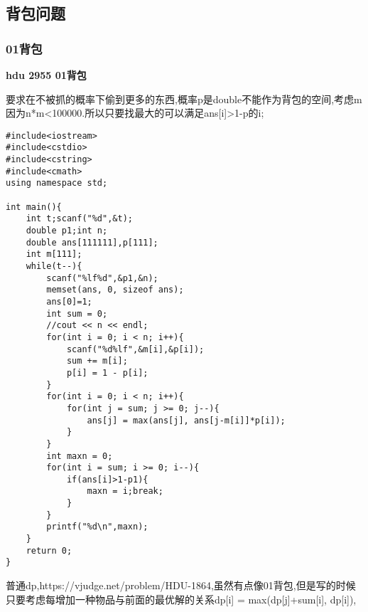 \subsection{背包问题}

\subsubsection{01背包}

{\bfseries hdu 2955 01背包}

要求在不被抓的概率下偷到更多的东西,概率p是double不能作为背包的空间,考虑m因为n*m<100000.所以只要找最大的可以满足ans[i]>1-p的i;

\begin{lstlisting}
#include<iostream>
#include<cstdio>
#include<cstring>
#include<cmath>
using namespace std;

int main(){
    int t;scanf("%d",&t);
    double p1;int n;
    double ans[111111],p[111];
    int m[111];
    while(t--){
        scanf("%lf%d",&p1,&n);
        memset(ans, 0, sizeof ans);
        ans[0]=1;
        int sum = 0;
        //cout << n << endl;
        for(int i = 0; i < n; i++){
            scanf("%d%lf",&m[i],&p[i]);
            sum += m[i];
            p[i] = 1 - p[i];
        }
        for(int i = 0; i < n; i++){
            for(int j = sum; j >= 0; j--){
                ans[j] = max(ans[j], ans[j-m[i]]*p[i]);
            }
        }
        int maxn = 0;
        for(int i = sum; i >= 0; i--){
            if(ans[i]>1-p1){
                maxn = i;break;
            }
        }
        printf("%d\n",maxn);
    }
    return 0;
}
\end{lstlisting}

普通dp,https://vjudge.net/problem/HDU-1864,虽然有点像01背包,但是写的时候只要考虑每增加一种物品与前面的最优解的关系dp[i] = max(dp[j]+sum[i], dp[i]),


